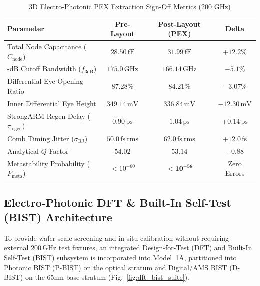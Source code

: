 \documentclass[journal]{IEEEtran}
\begin{document}
\begin{table}[!htbp]
\centering
\footnotesize
\caption{3D Electro-Photonic PEX Extraction Sign-Off Metrics (200 GHz)}
\label{tab:pex_metrics}
\begin{tabularx}{\columnwidth}{>{\raggedright\arraybackslash}X c c c}
\toprule
\textbf{Parameter} & \textbf{Pre-Layout} & \textbf{Post-Layout (PEX)} & \textbf{Delta} \\
\midrule
Total Node Capacitance ($C_{\mathrm{node}}$) & $28.50\,\mathrm{fF}$ & $\mathbf{31.99\,\mathrm{fF}}$ & $+12.2\%$ \\
3-dB Cutoff Bandwidth ($f_{\mathrm{3dB}}$) & $175.0\,\mathrm{GHz}$ & $\mathbf{166.14\,\mathrm{GHz}}$ & $-5.1\%$ \\
Differential Eye Opening Ratio & $87.28\%$ & $\mathbf{84.21\%}$ & $\mathbf{-3.07\%}$ \\
Inner Differential Eye Height & $349.14\,\mathrm{mV}$ & $\mathbf{336.84\,\mathrm{mV}}$ & $-12.30\,\mathrm{mV}$ \\
StrongARM Regen Delay ($\tau_{\mathrm{regen}}$) & $0.90\,\mathrm{ps}$ & $\mathbf{1.04\,\mathrm{ps}}$ & $+0.14\,\mathrm{ps}$ \\
Comb Timing Jitter ($\sigma_{\mathrm{RJ}}$) & $50.0\,\mathrm{fs~rms}$ & $\mathbf{62.0\,\mathrm{fs~rms}}$ & $+12.0\,\mathrm{fs}$ \\
Analytical $Q$-Factor & $54.02$ & $\mathbf{53.14}$ & $-0.88$ \\
Metastability Probability ($P_{\mathrm{meta}}$) & $< 10^{-60}$ & $\mathbf{< 10^{-58}}$ & Zero Errors \\
\bottomrule
\end{tabularx}
\end{table}

\subsection{Electro-Photonic DFT \& Built-In Self-Test (BIST) Architecture}
To provide wafer-scale screening and in-situ calibration without requiring external $200\,\mathrm{GHz}$ test fixtures, an integrated Design-for-Test (DFT) and Built-In Self-Test (BIST) subsystem is incorporated into Model~1A, partitioned into Photonic BIST (P-BIST) on the optical stratum and Digital/AMS BIST (D-BIST) on the 65nm base stratum (Fig.~\ref{fig:dft_bist_suite}).
\end{document}

